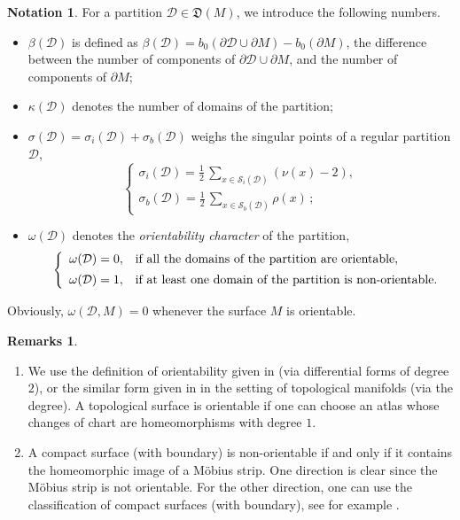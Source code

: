 \documentclass[12pt,a4paper]{amsart}
\theoremstyle{plain} %
\theoremstyle{definition}
\newtheorem{remarks}[theorem]{Remarks}
\newtheorem{notation}[theorem]{Notation}
\numberwithin{equation}{section}
\numberwithin{figure}{section}
\numberwithin{table}{section}
\newcommand{\cD}{\mathcal{D}}
\newcommand{\mf}{\mathfrak}
\newcommand{\bD}{\partial \cD}
\begin{document}
\begin{notation}\label{N-parti-2a}
For a partition $\cD \in \mf{D}(M)$, we introduce the following numbers.
\begin{itemize}
  \item[(a)] $\beta(\cD)$ is defined as $\beta(\cD) = b_0(\bD \cup \partial M) - b_0(\partial M)$, the difference between the number of components of $\bD \cup \partial M$, and the number of components of $\partial M$;
  \item[(b)] $\kappa(\cD)$ denotes the number of domains of the partition;
  \item[(c)] $\sigma(\cD) = \sigma_i(\cD)  + \sigma_b(\cD) $ weighs the singular points of a regular partition $\cD$,
  \begin{equation*}
  \left\{
  \begin{array}{ll}
  \sigma_i(\mathcal{D}) = \frac{1}{2}\, \sum_{x \in \mathcal{S}_i(\mathcal{D})}\left( \nu(x) - 2\right),\\[5pt]
\sigma_b(\mathcal{D}) = \frac{1}{2}\, \sum_{x \in \mathcal{S}_b(\mathcal{D})} \rho(x)\,;
  \end{array}%
  \right.
  \end{equation*}
  \item[(d)] $\omega(\cD)$ denotes the \emph{orientability character} of the partition,
%
\begin{equation*}
\hspace{5mm}\left\{
\begin{array}{ll}
\omega(\cD) = 0, & \text{if all the domains of the partition are orientable},\\[5pt]
\omega(\cD) = 1, & \text{if at least one domain of the partition is non-orientable.}
\end{array}%
\right.
\end{equation*}
\end{itemize}
%
Obviously, $\omega(\cD,M) = 0$ whenever the surface $M$ is orientable.
\end{notation}%


\begin{remarks}\label{R-parti-or}~
\begin{enumerate}
  \item[(i)] We use the definition of orientability given in \cite[Chap.~5.3]{BeGo1988} (via differential forms of degree $2$), or the similar form given in \cite[Chap.~4.5]{GaXu2013} in the setting of topological manifolds (via the degree).  A topological surface is orientable if one can choose an atlas whose changes of chart are homeomorphisms with degree $1$.
  \item[(ii)] A compact surface (with boundary) is non-orientable if and only if it contains the homeomorphic image of a M\"{o}bius strip. One direction is clear since the M\"{o}bius strip is not orientable. For the other direction, one can use the classification of compact surfaces (with boundary),  see for example \cite{GaXu2013}.
\end{enumerate}
\end{remarks}%
\end{document}
